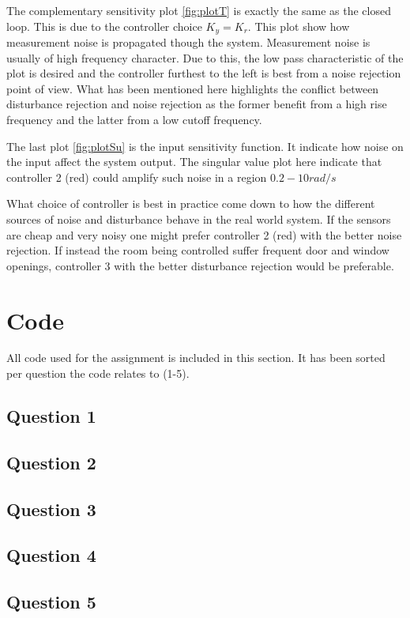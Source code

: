 \documentclass[a4paper, titlepage]{article}
\begin{document}
The complementary sensitivity plot \ref{fig:plotT} is exactly the same as the closed loop.
This is due to the controller choice $K_y = K_r$.
This plot show how measurement noise is propagated though the system.
Measurement noise is usually of high frequency character.
Due to this, the low pass characteristic of the plot is desired and the controller furthest to the left is best from a noise rejection point of view.
What has been mentioned here highlights the conflict between disturbance rejection and noise rejection as the former benefit from a high rise frequency and the latter from a low cutoff frequency.

The last plot \ref{fig:plotSu} is the input sensitivity function.
It indicate how noise on the input affect the system output.
The singular value plot here indicate that controller 2 (red) could amplify such noise in a region $0.2 - 10 rad/s$

What choice of controller is best in practice come down to how the different sources of noise and disturbance behave in the real world system.
If the sensors are cheap and very noisy one might prefer  controller 2 (red) with the better noise rejection.
If instead the room being controlled suffer frequent door and window openings, controller 3 with the better disturbance rejection would be preferable.

\clearpage


\clearpage

\appendix

\section{Code}
All code used for the assignment is included in this section.
It has been sorted per question the code relates to (1-5).

\subsection{Question 1}

\clearpage

\subsection{Question 2}

\clearpage

\subsection{Question 3}

\clearpage

\subsection{Question 4}

\clearpage

\subsection{Question 5}

\clearpage
\end{document}
